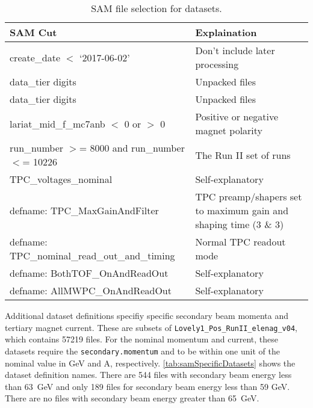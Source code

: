 \documentclass[letterpaper,12pt]{article}
\begin{document}
\begin{table}[!hbtp]
  \begin{center}
    \caption{SAM file selection for datasets.}
    \label{tab:samDatasetProps}
    \small
    \begin{tabu}{|p{2.5in}|p{2.4in}|} \hline
      SAM Cut & Explaination \\ \hline \hline
      create\_date $<$ `2017-06-02' & Don't include later processing \\ \hline
      data\_tier digits & Unpacked files \\ \hline
      data\_tier digits & Unpacked files \\ \hline
      lariat\_mid\_f\_mc7anb $<$ 0 or $>$ 0 & Positive or negative magnet polarity \\ \hline
      run\_number $>$= 8000 and run\_number $<$= 10226 & The Run II set of runs \\ \hline
      TPC\_voltages\_nominal & Self-explanatory \\ \hline
      defname: TPC\_MaxGainAndFilter & TPC preamp/shapers set to maximum gain and shaping time (3 \& 3)\\ \hline
      defname: TPC\_nominal\_read\_out\_and\_timing & Normal TPC readout mode \\ \hline
      defname: BothTOF\_OnAndReadOut & Self-explanatory \\ \hline
      defname: AllMWPC\_OnAndReadOut & Self-explanatory \\ \hline
    \end{tabu}
  \end{center}
\end{table}

Additional dataset definitions specifiy specific secondary beam momenta and
tertiary magnet current. These are subsets of
\texttt{Lovely1\_Pos\_RunII\_elenag\_v04}, which contains 57219 files.  For the
nominal momentum and current, these datasets require the
\texttt{secondary.momentum} and  to be within
one unit of the nominal value in GeV and A, respectively.
\cref{tab:samSpecificDatasets} shows the dataset definition names. There are
544 files with secondary beam energy less than 63~GeV and only 189 files for
secondary beam energy less than 59 GeV. There are no files with secondary beam
energy greater than 65~GeV.

\end{document}
